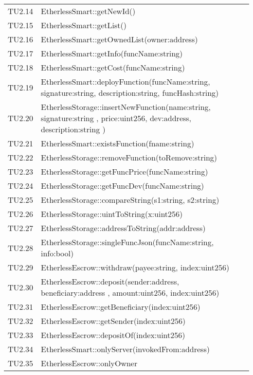 \begin{longtable}{
		>{\centering}p{}
		>{\centering\arraybackslash}p{}}
	TU2.14 &  EtherlessSmart::getNewId()  \tabularnewline
	
	TU2.15 &  EtherlessSmart::getList()  \tabularnewline
	
	TU2.16 &  EtherlessSmart::getOwnedList(owner:address)  \tabularnewline
	
	TU2.17 &  EtherlessSmart::getInfo(funcName:string)  \tabularnewline
	
	TU2.18 &  EtherlessSmart::getCost(funcName:string)  \tabularnewline
	
	TU2.19 &  EtherlessSmart::deployFunction(funcName:string, signature:string, description:string, funcHash:string)  \tabularnewline
	
	TU2.20 &  EtherlessStorage::insertNewFunction(name:string, signature:string , price:uint256, dev:address, description:string )  \tabularnewline
	
	TU2.21 &  EtherlessSmart::existsFunction(fname:string)  \tabularnewline
	
	TU2.22 &  EtherlessStorage::removeFunction(toRemove:string)  \tabularnewline
	
	TU2.23 &  EtherlessStorage::getFuncPrice(funcName:string)  \tabularnewline
	
	TU2.24 &  EtherlessStorage::getFuncDev(funcName:string)  \tabularnewline
	
	TU2.25 &  EtherlessStorage::compareString(s1:string, s2:string)  \tabularnewline
	
	TU2.26 &  EtherlessStorage::uintToString(x:uint256)  \tabularnewline
	
	TU2.27 &  EtherlessStorage::addressToString(addr:address)  \tabularnewline
	
	TU2.28 &  EtherlessStorage::singleFuncJson(funcName:string, info:bool)  \tabularnewline
	
	TU2.29 &  EtherlessEscrow::withdraw(payee:string, index:uint256)  \tabularnewline
	
	TU2.30 &  EtherlessEscrow::deposit(sender:address, beneficiary:address , amount:uint256, index:uint256)  \tabularnewline
	
	TU2.31 &  EtherlessEscrow::getBeneficiary(index:uint256)  \tabularnewline
	
	TU2.32 &  EtherlessEscrow::getSender(index:uint256)  \tabularnewline
	
	TU2.33 &  EtherlessEscrow::depositOf(index:uint256)  \tabularnewline
	
	TU2.34 &  EtherlessSmart::onlyServer(invokedFrom:address)  \tabularnewline
	
	TU2.35 &  EtherlessEscrow::onlyOwner  \tabularnewline
	

\end{longtable}
